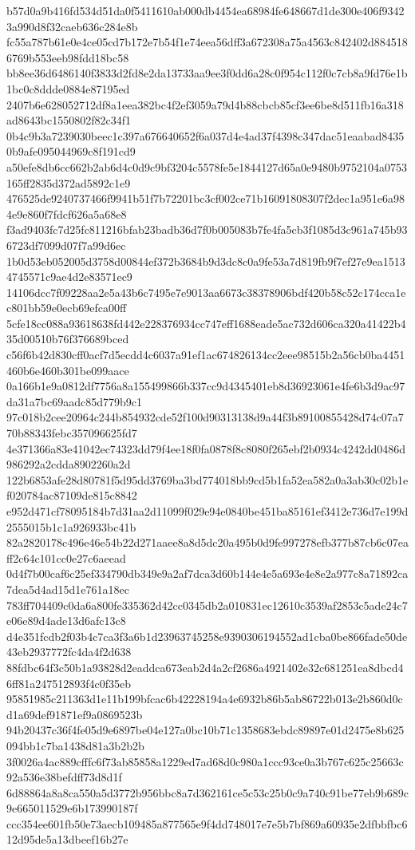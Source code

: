 {b57d0a9b416fd534d51da0f5411610ab000db4454ea68984fe648667d1de300e406f93423a990d8f32caeb636c284e8b
fc55a787b61e0e4ce05cd7b172e7b54f1e74eea56dff3a672308a75a4563c842402d8845186769b553eeb98fdd18bc58
bb8ee36d6486140f3833d2fd8e2da13733aa9ee3f0dd6a28c0f954c112f0c7cb8a9fd76e1b1bc0c8ddde0884e87195ed
2407b6e628052712df8a1eea382bc4f2ef3059a79d4b88cbcb85cf3ee6be8d511fb16a318ad8643bc1550802f82c34f1
0b4c9b3a7239030beec1c397a676640652f6a037d4e4ad37f4398c347dac51eaabad84350b9afe095044969c8f191cd9
a50efe8db6cc662b2ab6d4c0d9c9bf3204c5578fe5e1844127d65a0e9480b9752104a0753165ff2835d372ad5892c1e9
476525de9240737466f9941b51f7b72201bc3cf002ce71b16091808307f2dec1a951e6a984e9e860f7fdcf626a5a68e8
f3ad9403fc7d25fc811216bfab23badb36d7f0b005083b7fe4fa5cb3f1085d3c961a745b936723df7099d07f7a99d6ec
1b0d53eb052005d3758d00844ef372b3684b9d3dc8c0a9fe53a7d819fb9f7ef27e9ea15134745571c9ae4d2e83571ec9
14106dcc7f09228aa2e5a43b6c7495e7e9013aa6673c38378906bdf420b58c52c174cca1ec801bb59e0ecb69efca00ff
5cfe18cc088a93618638fd442e228376934cc747eff1688eade5ac732d606ca320a41422b435d00510b76f376689bced
c56f6b42d830cff0acf7d5ecdd4c6037a91ef1ac674826134cc2eee98515b2a56cb0ba4451460b6e460b301be099aace
0a166b1e9a0812df7756a8a155499866b337cc9d4345401eb8d36923061e4fe6b3d9ac97da31a7bc69aadc85d779b9c1
97c018b2cee20964c244b854932cde52f100d90313138d9a44f3b89100855428d74c07a770b88343febc357096625fd7
4e371366a83e41042ec74323dd79f4ee18f0fa0878f8c8080f265ebf2b0934c4242dd0486d986292a2cdda8902260a2d
122b6853afe28d80781f5d95dd3769ba3bd774018bb9cd5b1fa52ea582a0a3ab30c02b1ef020784ac87109de815c8842
e952d471cf78095184b7d31aa2d11099f029e94e0840be451ba85161ef3412e736d7e199d2555015b1c1a926933bc41b
82a2820178c496e46e54b22d271aaee8a8d5dc20a495b0d9fe997278efb377b87cb6c07eaff2c64c101cc0e27c6aeead
0d4f7b00caf6c25ef334790db349e9a2af7dca3d60b144e4e5a693e4e8e2a977c8a71892ca7dea5d4ad15d1e761a18ec
783ff704409c0da6a800fe335362d42cc0345db2a010831ec12610c3539af2853c5ade24c7e06e89d4ade13d6afc13c8
d4e351fcdb2f03b4c7ca3f3a6b1d23963745258e9390306194552ad1cba0be866fade50de43eb2937772fc4da4f2d638
88fdbc64f3c50b1a93828d2eaddca673eab2d4a2cf2686a4921402e32c681251ea8dbcd46ff81a247512893f4c0f35eb
95851985c211363d1e11b199bfcac6b42228194a4e6932b86b5ab86722b013e2b860d0cd1a69def91871ef9a0869523b
94b20437c36f4fe05d9e6897be04e127a0bc10b71c1358683ebdc89897e01d2475e8b625094bb1c7ba1438d81a3b2b2b
3f0026a4ac889cfffc6f73ab85858a1229ed7ad68d0c980a1ccc93ce0a3b767c625c25663c92a536e38befdff73d8d1f
6d88864a8a8ca550a5d3772b956bbc8a7d362161ce5c53c25b0c9a740c91be77eb9b689c9e665011529e6b173990187f
ccc354ee601fb50e73aecb109485a877565e9f4dd748017e7e5b7bf869a60935e2dfbbfbc612d95de5a13dbeef16b27e
}

